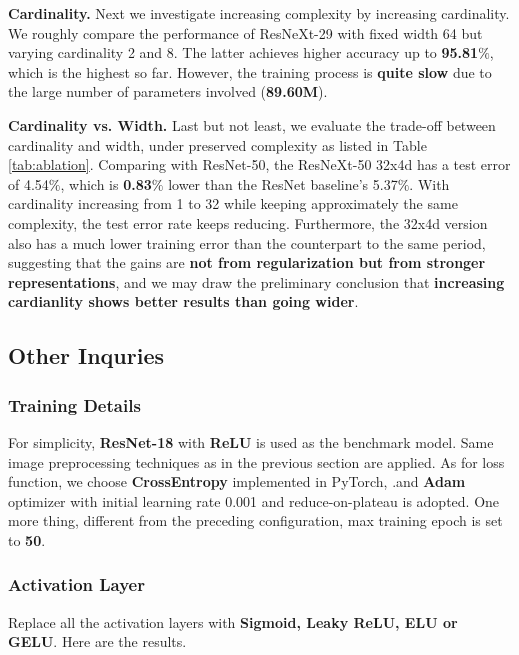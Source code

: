 \documentclass[a4paper, 11pt]{article} %
\begin{document}
\textbf{Cardinality.} Next we investigate increasing complexity by increasing cardinality.
We roughly compare the performance of ResNeXt-29 with fixed width 64 but varying cardinality
2 and 8. The latter achieves higher accuracy up to \textbf{95.81$\%$}, which is the highest
so far. However, the training process is \textbf{quite slow} due to the large number of
parameters involved (\textbf{89.60M}).

\textbf{Cardinality vs. Width.} Last but not least, we evaluate the trade-off between
cardinality and width, under preserved complexity as listed in Table \ref{tab:ablation}.
Comparing with ResNet-50, the ResNeXt-50 32x4d has a test error of 4.54$\%$, which is
\textbf{0.83$\%$} lower than the ResNet baseline's 5.37$\%$. With cardinality increasing
from 1 to 32 while keeping approximately the same complexity, the test error rate keeps
reducing. Furthermore, the 32x4d version also has a much lower training error than the
counterpart to the same period, suggesting that the gains are
\textbf{not from regularization but from stronger representations},
and we may draw the preliminary conclusion that
\textbf{increasing cardianlity shows better results than going wider}.

\subsection{\textbf{Other Inquries}}

\subsubsection{\textbf{Training Details}}

For simplicity, \textbf{ResNet-18} with \textbf{ReLU} is used as the benchmark model. Same
image preprocessing techniques as in the previous section are applied. As for loss function,
we choose \textbf{CrossEntropy} implemented in PyTorch, .and \textbf{Adam} optimizer with
initial learning rate 0.001 and reduce-on-plateau is adopted. One more thing, different from
the preceding configuration, max training epoch is set to \textbf{50}.

\subsubsection{\textbf{Activation Layer}}

Replace all the activation layers with \textbf{Sigmoid, Leaky ReLU, ELU or GELU}. Here are
the results.
\end{document}
